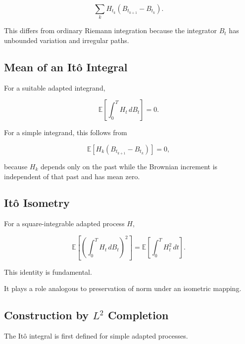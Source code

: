 \[
\boxed{
\sum_k
H_{t_k}
\left(
B_{t_{k+1}}-B_{t_k}
\right).
}
\]

This differs from ordinary Riemann integration because the integrator
\(B_t\) has unbounded variation and irregular paths.

\subsection{Mean of an It\^o Integral}
\label{subsec:mean-ito-integral}

For a suitable adapted integrand,

\[
\boxed{
\mathbb{E}
\left[
\int_0^T
H_t\,dB_t
\right]
=
0.
}
\]

For a simple integrand, this follows from

\[
\mathbb{E}
[
H_k
(B_{t_{k+1}}-B_{t_k})
]
=
0,
\]

because \(H_k\) depends only on the past while the Brownian increment is
independent of that past and has mean zero.

\subsection{It\^o Isometry}
\label{subsec:ito-isometry}

\begin{theorem}[It\^o Isometry]
For a square-integrable adapted process \(H\),

\[
\boxed{
\mathbb{E}
\left[
\left(
\int_0^T
H_t\,dB_t
\right)^2
\right]
=
\mathbb{E}
\left[
\int_0^T
H_t^2\,dt
\right].
}
\]
\end{theorem}

This identity is fundamental.

It plays a role analogous to preservation of norm under an isometric
mapping.

\subsection{Construction by \(L^2\) Completion}
\label{subsec:ito-construction-l2}

The It\^o integral is first defined for simple adapted processes.

